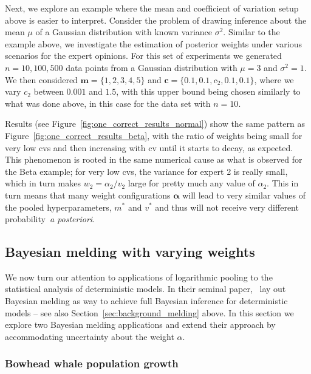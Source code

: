 \documentclass[a4paper, notitlepage, 11pt]{article}
\begin{document}
Next, we explore an example where the mean and coefficient of variation setup above is easier to interpret.
Consider the problem of drawing inference about the mean $\mu$ of a Gaussian distribution with known variance $\sigma^2$.
Similar to the example above, we investigate the estimation of posterior weights under various scenarios for the expert opinions.
For this set of experiments we generated $n=10, 100, 500$ data points from a Gaussian distribution with $\mu=3$ and  $\sigma^2 = 1$.
We then considered $\boldsymbol{m} = \{1, 2, 3, 4, 5\}$ and $\boldsymbol c = \{0.1, 0.1, c_2, 0.1, 0.1 \}$, where we vary $c_2$ between $0.001$ and $1.5$, with this upper bound being chosen similarly to what was done above, in this case for the data set with $n=10$.

Results (see Figure~\ref{fig:one_correct_results_normal}) show the same pattern as Figure~\ref{fig:one_correct_results_beta}, with the ratio of weights being small for very low cvs and then increasing with cv until it starts to decay, as expected.
This phenomenon is rooted in the same numerical cause as what is observed for the Beta example; for very low cvs, the variance for expert 2 is really small, which in turn makes $w_2 = \alpha_2/v_2$ large for pretty much any value of $\alpha_2$.
This in turn means that many weight configurations $\boldsymbol{\alpha}$ will lead to very similar values of the pooled hyperparameters, $m^\ast$ and $v^\ast$ and thus will not receive very different probability~\textit{a posteriori}.

\subsection{Bayesian melding with varying weights}
\label{sec:melding_apps}

We now turn our attention to applications of logarithmic pooling to the statistical analysis of deterministic models.
In their seminal paper,~\cite{Poole2000} lay out Bayesian melding as way to achieve full Bayesian inference for deterministic models -- see also Section~\ref{sec:background_melding} above.
In this section we explore two Bayesian melding applications and extend their approach by accommodating uncertainty about the weight $\alpha$. 

\subsubsection{Bowhead whale population growth}
\label{sec:bowhead}
\end{document}
